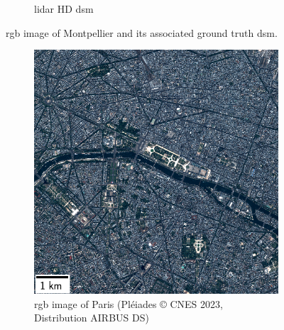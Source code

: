 \begin{figure}
\begin{subfigure}[t]{0.48\linewidth}
        \caption{\acrshort{lidar} HD \acrshort{dsm}}
        \label{fig:miniature_Montpellier_gt}
    \end{subfigure}
    \caption{\acrshort{rgb} image of Montpellier and its associated ground truth \acrshort{dsm}.}
    \label{fig:miniature_Montpellier}
\end{figure}

\begin{figure}
    \centering
    \begin{subfigure}[t]{0.48\linewidth}
        \flushleft
        \includegraphics[width=\linewidth]{Images/Chap_6/miniature_Paris.png}
        \caption{\acrshort{rgb} image of Paris (Pléiades © CNES 2023, Distribution AIRBUS DS)}
        \label{fig:miniature_Paris_rgb}
    \end{subfigure}\hfill
    \begin{subfigure}[t]{0.48\linewidth}
        \flushright

\end{subfigure}
\end{figure}
